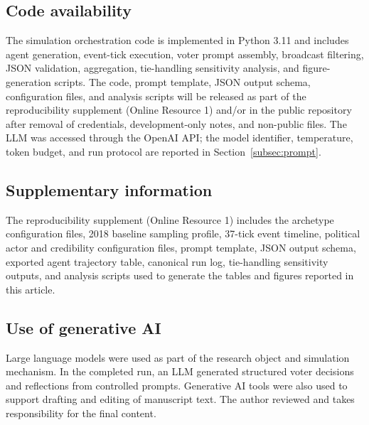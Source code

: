 \documentclass[pdflatex,sn-mathphys-num,iicol]{sn-jnl}
\begin{document}
\subsection*{Code availability}

The simulation orchestration code is implemented in Python 3.11 and includes agent generation, event-tick execution, voter prompt assembly, broadcast filtering, JSON validation, aggregation, tie-handling sensitivity analysis, and figure-generation scripts. The code, prompt template, JSON output schema, configuration files, and analysis scripts will be released as part of the reproducibility supplement (Online Resource 1) and/or in the public repository after removal of credentials, development-only notes, and non-public files. The LLM was accessed through the OpenAI API; the model identifier, temperature, token budget, and run protocol are reported in Section~\ref{subsec:prompt}.

\subsection*{Supplementary information}

The reproducibility supplement (Online Resource 1) includes the archetype configuration files, 2018 baseline sampling profile, 37-tick event timeline, political actor and credibility configuration files, prompt template, JSON output schema, exported agent trajectory table, canonical run log, tie-handling sensitivity outputs, and analysis scripts used to generate the tables and figures reported in this article.

\subsection*{Use of generative AI}

Large language models were used as part of the research object and simulation mechanism. In the completed run, an LLM generated structured voter decisions and reflections from controlled prompts. Generative AI tools were also used to support drafting and editing of manuscript text. The author reviewed and takes responsibility for the final content.
\end{document}
